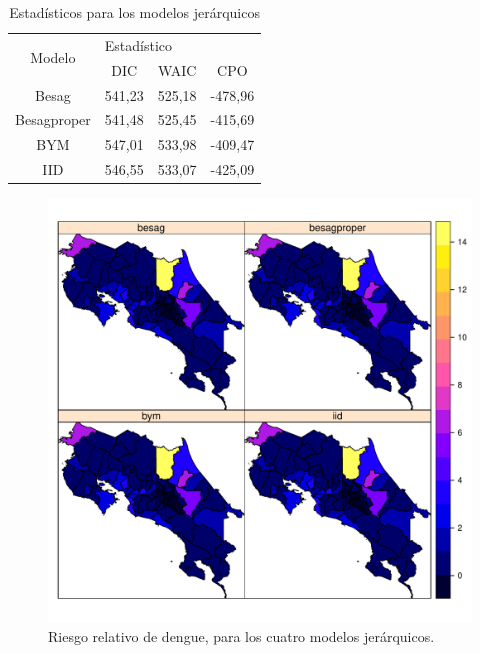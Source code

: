 \documentclass[a4paper,12pt]{report}
\begin{document}
\begin{table}[hbtp]
\centering
\caption{Estadísticos para los modelos jerárquicos}
\begin{tabular}{cccc}
\hline
\multirow{2}{*}{Modelo} & \multicolumn{3}{l}{Estadístico}\\ \cline{2-4} 
&DIC&WAIC&CPO\\ \hline
Besag&541,23&525,18&-478,96\\
Besagproper&541,48&525,45&-415,69\\
BYM&547,01&533,98&-409,47\\
IID&546,55&533,07&-425,09\\ \hline
\end{tabular}
\end{table}

\begin{figure}[t]
\centering
\includegraphics[scale=0.45]{FF2.pdf}
\caption{Riesgo relativo de dengue, para los cuatro modelos jerárquicos.}
\end{figure}
\end{document}
